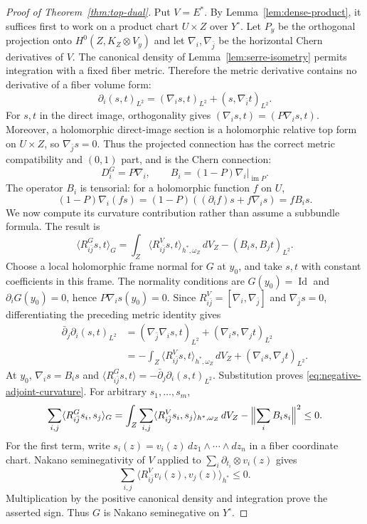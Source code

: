 \documentclass[11pt,reqno]{amsart}
\numberwithin{equation}{section}
\theoremstyle{definition}
\theoremstyle{remark}
\newcommand{\Id}{\operatorname{Id}}
\begin{document}
\begin{proof}[Proof of Theorem~\ref{thm:top-dual}]
Put $V=E^*$.  By Lemma~\ref{lem:dense-product}, it suffices first
to work on a product chart $U\times Z$ over $Y^\circ$.
Let $P_y$ be the
orthogonal projection onto $H^0(Z,K_Z\otimes V_y)$ and let
$\nabla_i,\nabla_{\bar j}$ be the horizontal Chern derivatives of $V$.
The canonical density of Lemma~\ref{lem:serre-isometry} permits
integration with a fixed fiber metric.  Therefore the metric
derivative contains no derivative of a fiber volume form:
\[
 \partial_i(s,t)_{L^2}
   =(\nabla_i s,t)_{L^2}+(s,\nabla_{\bar i}t)_{L^2}.
\]
For $s,t$ in the direct image, orthogonality gives
$(\nabla_i s,t)=(P\nabla_i s,t)$.
Moreover, a holomorphic direct-image section is a holomorphic
relative top form on $U\times Z$, so $\nabla_{\bar j}s=0$.
Thus the projected connection has the correct metric compatibility
and $(0,1)$ part, and is the Chern connection:
\[
 D_i^G=P\nabla_i,\qquad B_i=(1-P)\nabla_i|_{\operatorname{im}P}.
\]
The operator $B_i$ is tensorial: for a holomorphic function $f$ on $U$,
\[
 (1-P)\nabla_i(fs)
 =(1-P)((\partial_i f)s+f\nabla_i s)=fB_i s.
\]
We now compute its curvature contribution rather than assume a
subbundle formula.  The result is
\begin{equation}\label{eq:negative-adjoint-curvature}
 \langle R^G_{i\bar j}s,t\rangle_G
 =\int_Z\langle R^V_{i\bar j}s,t\rangle_{h^*,\omega_Z}\,dV_Z
       -(B_i s,B_j t)_{L^2}.
\end{equation}
Choose a local holomorphic frame normal for $G$ at $y_0$, and take
$s,t$ with constant coefficients in this frame.  The normality
conditions are $G(y_0)=\Id$ and $\partial_iG(y_0)=0$, hence
$P\nabla_i s(y_0)=0$.  Since
$R^V_{i\bar j}=[\nabla_i,\nabla_{\bar j}]$ and
$\nabla_{\bar j}s=0$, differentiating the preceding metric identity gives
\[
 \begin{aligned}
 \bar\partial_j\partial_i(s,t)_{L^2}
   &=(\nabla_{\bar j}\nabla_i s,t)_{L^2}
          +(\nabla_i s,\nabla_j t)_{L^2}\\
   &=-\int_Z\langle R^V_{i\bar j}s,t\rangle_{h^*,\omega_Z}\,dV_Z
          +(\nabla_i s,\nabla_j t)_{L^2}.
 \end{aligned}
\]
At $y_0$, $\nabla_i s=B_i s$ and
$\langle R^G_{i\bar j}s,t\rangle
=-\bar\partial_j\partial_i(s,t)_{L^2}$.
Substitution proves
\eqref{eq:negative-adjoint-curvature}.
For arbitrary $s_1,\ldots,s_m$,
\[
 \sum_{i,j}\langle R^G_{i\bar j}s_i,s_j\rangle_G
 =\int_Z\sum_{i,j}\langle R^V_{i\bar j}s_i,s_j\rangle_{h^*,\omega_Z}\,dV_Z
   -\Bigl\|\sum_iB_i s_i\Bigr\|^2\le0.
\]
For the first term, write $s_i(z)=v_i(z)\,dz_1\wedge\cdots\wedge dz_n$
in a fiber coordinate chart.  Nakano seminegativity of $V$ applied
to $\sum_i\partial_{t_i}\otimes v_i(z)$ gives
\[
 \sum_{i,j}\langle R^V_{i\bar j}v_i(z),v_j(z)\rangle_{h^*}\le0.
\]
Multiplication by the positive canonical density and integration
prove the asserted sign.  Thus $G$ is Nakano seminegative on
$Y^\circ$.


\end{proof}
\end{document}
